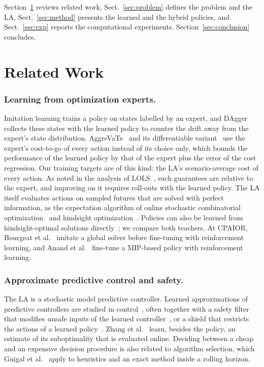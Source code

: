 \documentclass[runningheads]{llncs}
\begin{document}
Section~\ref{sec:related} reviews related work, Sect.~\ref{sec:problem}
defines the problem and the LA, Sect.~\ref{sec:method} presents the learned
and the hybrid policies, and Sect.~\ref{sec:exp} reports the computational
experiments. Section~\ref{sec:conclusion} concludes.

\section{Related Work}
\label{sec:related}

\subsubsection{Learning from optimization experts.}
Imitation learning trains a policy on states labelled by an expert, and
DAgger~\cite{ross2011} collects these states with the learned policy to
counter the drift away from the expert's state distribution.
AggreVaTe~\cite{ross_bagnell2014} and its differentiable
variant~\cite{sun2017aggrevated} use the expert's cost-to-go of every action
instead of its choice only, which bounds the performance of the learned policy
by that of the expert plus the error of the cost regression. Our training
targets are of this kind: the LA's scenario-average cost of every action. As
noted in the analysis of LOLS~\cite{chang2015lols}, such guarantees are
relative to the expert, and improving on it requires roll-outs with the
learned policy. The LA itself evaluates actions on sampled futures that are
solved with perfect information, as the expectation algorithm of online
stochastic combinatorial optimization~\cite{vanhentenryck2006} and hindsight
optimization~\cite{yoon2008}. Policies can also be learned from
hindsight-optimal solutions directly~\cite{baty2024,sinclair2023}; we compare
both teachers. At CPAIOR, Bourgeat et al.~\cite{bourgeat2026} imitate a global
solver before fine-tuning with reinforcement learning, and Anand et
al.~\cite{anand2026} fine-tune a MIP-based policy with reinforcement learning.

\subsubsection{Approximate predictive control and safety.}
The LA is a stochastic model predictive controller. Learned approximations of
predictive controllers are studied in control~\cite{hertneck2018,karg2020},
often together with a safety filter that modifies unsafe inputs of the learned
controller~\cite{wabersich2021}, or a shield that restricts the actions of a
learned policy~\cite{alshiekh2018}. Zhang et al.~\cite{zhang2019certificate}
learn, besides the policy, an estimate of its suboptimality that is evaluated
online. Deciding between a cheap and an expensive decision procedure is also
related to algorithm selection, which Guigal et al.~\cite{guigal2026} apply to
heuristics and an exact method inside a rolling horizon.
\end{document}

